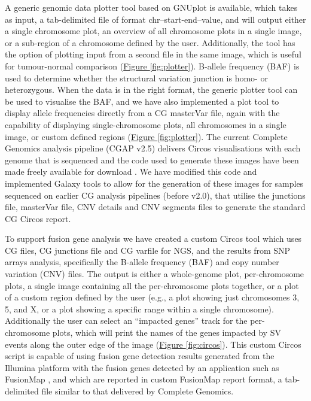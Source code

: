 A generic genomic data plotter tool based on GNUplot is available, which takes as input, a tab-delimited file of format chr–start-end–value, and will output either a single chromosome plot, an overview of all chromosome plots in a single image, or a sub-region of a chromosome defined by the user. Additionally, the tool has the option of plotting input from a second file in the same image, which is useful for tumour-normal comparison (\hyperref[fig:plotter]{Figure \ref{fig:plotter}}). B-allele frequency (BAF) is used to determine whether the structural variation junction is homo- or heterozygous. When the data is in the right format, the generic plotter tool can be used to visualise the BAF, and we have also implemented a plot tool to display allele frequencies directly from a CG masterVar file, again with the capability of displaying single-chromosome plots, all chromosomes in a single image, or custom defined regions (\hyperref[fig:plotter]{Figure \ref{fig:plotter}}). The current Complete Genomics analysis pipeline (CGAP v2.5) delivers Circos \cite{url-circos} visualisations with each genome that is sequenced and the code used to generate these images have been made freely available for download \cite{url-cgcircos}. We have modified this code and implemented Galaxy tools to allow for the generation of these images for samples sequenced on earlier CG analysis pipelines (before v2.0), that utilise the junctions file, masterVar file, CNV details and CNV segments files to generate the standard CG Circos report.


To support fusion gene analysis we have created a custom Circos tool which uses CG files, CG junctions file and CG varfile for NGS, and the results from SNP arrays analysis, specifically the B-allele frequency (BAF) and copy number variation (CNV) files. The output is either a whole-genome plot, per-chromosome plots, a single image containing all the per-chromosome plots together, or a plot of a custom region defined by the user (e.g., a plot showing just chromosomes 3, 5, and X, or a plot showing a specific range within a single chromosome). Additionally the user can select an “impacted genes” track for the per-chromosome plots, which will print the names of the genes impacted by SV events along the outer edge of the image (\hyperref[fig:circos]{Figure \ref{fig:circos}}). This custom Circos script is capable of using fusion gene detection results generated from the Illumina platform with the fusion genes detected by an application such as FusionMap \cite{ge2011fusionmap}, and which are reported in custom FusionMap report format, a tab-delimited file similar to that delivered by Complete Genomics.


